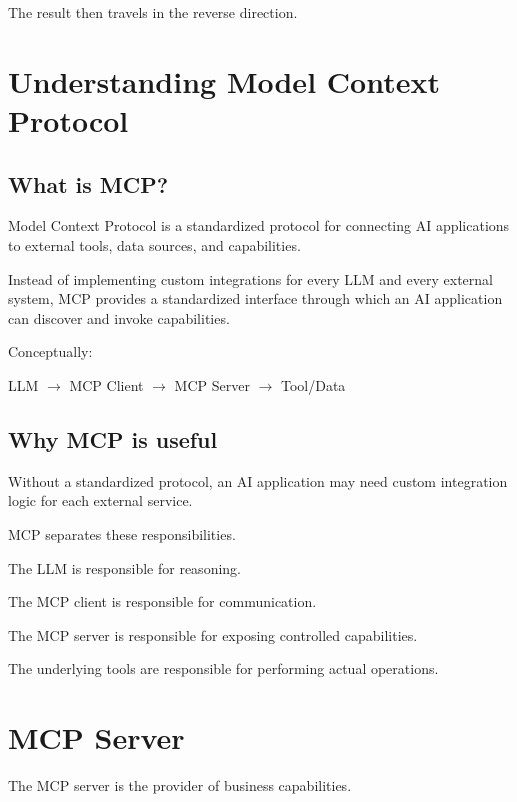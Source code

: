 \documentclass[11pt,a4paper]{article}
\begin{document}
The result then travels in the reverse direction.

\section{Understanding Model Context Protocol}

\subsection{What is MCP?}

Model Context Protocol is a standardized protocol for connecting AI
applications to external tools, data sources, and capabilities.

Instead of implementing custom integrations for every LLM and every
external system, MCP provides a standardized interface through which
an AI application can discover and invoke capabilities.

Conceptually:

\begin{center}
LLM $\rightarrow$ MCP Client $\rightarrow$ MCP Server $\rightarrow$ Tool/Data
\end{center}

\subsection{Why MCP is useful}

Without a standardized protocol, an AI application may need custom
integration logic for each external service.

MCP separates these responsibilities.

The LLM is responsible for reasoning.

The MCP client is responsible for communication.

The MCP server is responsible for exposing controlled capabilities.

The underlying tools are responsible for performing actual operations.

\section{MCP Server}

The MCP server is the provider of business capabilities.
\end{document}
